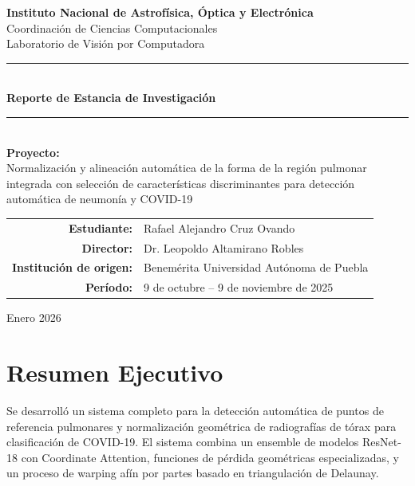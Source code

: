 \documentclass[12pt,a4paper]{article}
\begin{document}
\begin{titlepage}
    \centering
    \vspace*{1cm}

    {\Large\textbf{Instituto Nacional de Astrofísica, Óptica y Electrónica}}\\[0.3cm]
    {\large Coordinación de Ciencias Computacionales}\\[0.3cm]
    {\large Laboratorio de Visión por Computadora}\\[2cm]

    \rule{\textwidth}{1.5pt}\\[0.5cm]
    {\LARGE\bfseries Reporte de Estancia de Investigación}\\[0.5cm]
    \rule{\textwidth}{1.5pt}\\[1.5cm]

    {\Large\textbf{Proyecto:}}\\[0.3cm]
    {\large Normalización y alineación automática de la forma de la región pulmonar integrada con selección de características discriminantes para detección automática de neumonía y COVID-19}\\[2cm]

    \begin{tabular}{rl}
        \textbf{Estudiante:} & Rafael Alejandro Cruz Ovando \\[0.3cm]
        \textbf{Director:} & Dr. Leopoldo Altamirano Robles \\[0.3cm]
        \textbf{Institución de origen:} & Benemérita Universidad Autónoma de Puebla \\[0.3cm]
        \textbf{Período:} & 9 de octubre -- 9 de noviembre de 2025 \\
    \end{tabular}

    \vfill

    {\large Enero 2026}
\end{titlepage}

\section{Resumen Ejecutivo}

Se desarrolló un sistema completo para la detección automática de puntos de referencia pulmonares y normalización geométrica de radiografías de tórax para clasificación de COVID-19. El sistema combina un ensemble de modelos ResNet-18 con Coordinate Attention, funciones de pérdida geométricas especializadas, y un proceso de warping afín por partes basado en triangulación de Delaunay.
\end{document}
